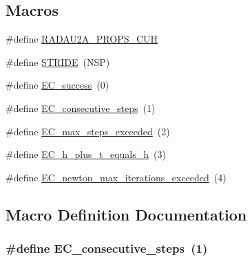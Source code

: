 \subsection*{Macros}
\begin{DoxyCompactItemize}
\item 
\#define \hyperlink{radau2a__props_8cuh_acb5834e026c7d7045b16acfcb25a5f7d}{R\+A\+D\+A\+U2\+A\+\_\+\+P\+R\+O\+P\+S\+\_\+\+C\+UH}
\item 
\#define \hyperlink{radau2a__props_8cuh_a351d54267048643c4365f6a24641d0cf}{S\+T\+R\+I\+DE}~(N\+SP)
\item 
\#define \hyperlink{radau2a__props_8cuh_abd83bc0f9f475a2189a4db4a08b790ca}{E\+C\+\_\+success}~(0)
\item 
\#define \hyperlink{radau2a__props_8cuh_ae0287841c08f86f5709660fd731615ad}{E\+C\+\_\+consecutive\+\_\+steps}~(1)
\item 
\#define \hyperlink{radau2a__props_8cuh_a0f0275d9851ab5c19b79a963d5084df3}{E\+C\+\_\+max\+\_\+steps\+\_\+exceeded}~(2)
\item 
\#define \hyperlink{radau2a__props_8cuh_a9326efd544880e2683c4453365ca2704}{E\+C\+\_\+h\+\_\+plus\+\_\+t\+\_\+equals\+\_\+h}~(3)
\item 
\#define \hyperlink{radau2a__props_8cuh_aae2906abd9ae8a2791c2e8626ca73a32}{E\+C\+\_\+newton\+\_\+max\+\_\+iterations\+\_\+exceeded}~(4)
\end{DoxyCompactItemize}


\subsection{Macro Definition Documentation}
\subsubsection[{\texorpdfstring{E\+C\+\_\+consecutive\+\_\+steps}{EC_consecutive_steps}}]{\setlength{\rightskip}{0pt plus 5cm}\#define E\+C\+\_\+consecutive\+\_\+steps~(1)}\hypertarget{radau2a__props_8cuh_ae0287841c08f86f5709660fd731615ad}{}\label{radau2a__props_8cuh_ae0287841c08f86f5709660fd731615ad}
